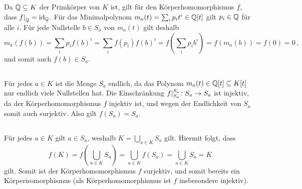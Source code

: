 \section{}





\subsection{}

Da $\mathbb{Q} \subseteq K$ der Primkörper von $K$ ist, gilt für den Körperhomomorphismus $f$, dass $\restrict{f}{\Rational} = \id_\Rational$.
Für das Minimalpolynom $m_a(t) = \sum_i p_i t^i \in \mathbb{Q}[t]$ gilt $p_i \in \mathbb{Q}$ für alle $i$.
Für jede Nullstelle $b \in S_a$ von $m_a(t)$ gilt deshalb
\[
    m_a( f(b) )
  = \sum_i p_i f(b)^i
  = \sum_i f(p_i) f(b)^i
  = f\left( \sum_i p_i b^i \right)
  = f( m_a(b) )
  = f( 0 )
  = 0 \,,
\]
und somit auch $f(b) \in S_a$.





\subsection{}

Für jedes $a \in K$ ist die Menge $S_a$ endlich, da das Polynom $m_a(t) \in \mathbb{Q}[t] \subseteq K[t]$ nur endlich viele Nullstellen hat.
Die Einschränkung $\restrict{f}{S_a}[S_a] \colon S_a \to S_a$ ist injektiv, da der Körperhomomorphismus $f$ injektiv ist, und wegen der Endlichkeit von $S_a$ somit auch surjektiv.
Also gilt $f(S_a) = S_a$.





\subsection{}

Für jedes $a \in K$ gilt $a \in S_a$, weshalb $K = \bigcup_{a \in K} S_a$ gilt.
Hiermit folgt, dass
\[
    f(K)
  = f\left( \bigcup_{a \in K} S_a \right)
  = \bigcup_{a \in K} f(S_a)
  = \bigcup_{a \in K} S_a
  = K
\]
gilt.
Somit ist der Körperhomomorphismus $f$ surjektiv, und somit bereits ein Körperisomorphismus (als Körperhomomorphismus ist $f$ insbesondere injektiv).
